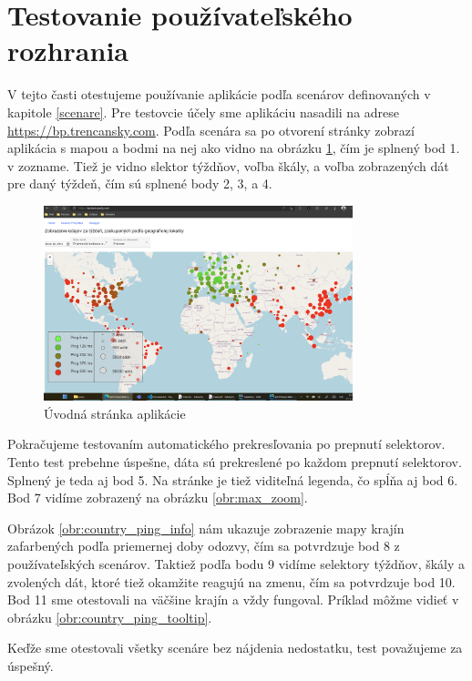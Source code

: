 \section{Testovanie používateľského rozhrania}
V tejto časti otestujeme používanie aplikácie podľa scenárov definovaných v kapitole \ref{scenare}. Pre testovcie účely sme aplikáciu nasadili na adrese 
\href{https://bp.trencansky.com/}{https://bp.trencansky.com}. Podľa scenára sa po otvorení stránky zobrazí aplikácia s mapou a bodmi na nej ako vidno 
na obrázku \ref{obr:uvod_stranka}, čím je splnený bod 1. v zozname. Tiež je vidno slektor týždňov, voľba škály, a voľba zobrazených dát pre daný týždeň, čím sú 
splnené body 2, 3, a 4.   
\begin{figure}
    \centerline{\includegraphics[width=0.8\textwidth]{images/uvodna_stranka}}
    \caption[Úvodná stránka aplikácie]{Úvodná stránka aplikácie}
    \label{obr:uvod_stranka}
\end{figure}
\label{test_interface}

Pokračujeme testovaním automatického prekresľovania po prepnutí selektorov. Tento test prebehne úspešne, dáta sú prekreslené po každom prepnutí selektorov.
Splnený je teda aj bod 5. Na stránke je tiež viditeľná legenda, čo spĺňa aj bod 6. Bod 7 vidíme zobrazený na obrázku \ref{obr:max_zoom}. 

Obrázok \ref{obr:country_ping_info} nám ukazuje zobrazenie mapy krajín zafarbených podľa priemernej doby odozvy, čím sa potvrdzuje bod 8 z používateľských
scenárov. Taktiež podľa bodu 9 vidíme selektory týždňov, škály a zvolených dát, ktoré tiež okamžite reagujú na zmenu, čím sa potvrdzuje bod 10. 
Bod 11 sme otestovali na väčšine krajín a vždy fungoval. Príklad môžme vidieť v obrázku \ref{obr:country_ping_tooltip}.

Keďže sme otestovali všetky scenáre bez nájdenia nedostatku, test považujeme za úspešný.

